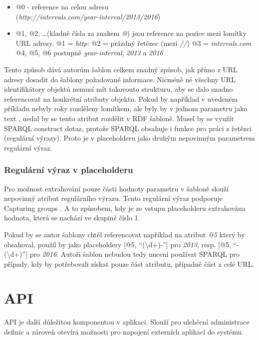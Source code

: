 \documentclass[thesis=B,czech]{FITthesis}[2012/06/26]
\begin{document}
 \begin{itemize}
  \item @0 - reference na celou adresu\\(\textit{http://intervals.com/year-interval/2013/2016})
  \item @1, @2, \ldots (kladné čísla za znakem \textit{@}) jsou reference na pozice mezi lomítky URL adresy.
    \subitem @1 = \textit{http:}
    \subitem @2 = prázdný řetězec (mezi \textit{//})
    \subitem @3 = \textit{intervals.com}
    \subitem @4, @5, @6 postupně \textit{year-interval}, \textit{2013} a \textit{2016}
 \end{itemize}
 Tento způsob dává autorům šablon celkem snadný způsob, jak přímo z URL adresy dosadit do šablony požadované informace. Nicméně né všechny URL identifikátory objektů
 nemusí mít takovouto strukturu, aby se dalo snadno referencovat na konkrétní atributy objektu. Pokud by například v uvedeném příkladu nebyly roky rozděleny lomítkem,
 ale byly by v jednom parametru jako text , nedal by se tento atribut rozdělit v RDF šabloně. Musel by se využít SPARQL construct dotaz, protože
 SPARQL obsahuje i funkce pro práci z řetězci (regulární výrazy). Proto je v placeholderu jako druhým nepovinným parametrem regulární výraz.
 
 \subsubsection{Regulární výraz v placeholderu}
  Pro možnost extrahování pouze části hodnoty parametru v šabloně slouží nepovinný atribut regulárního výrazu. Tento regulární výraz
  podporuje Capturing groups \cite{capture_group}. A to způsobem, kdy je ze vstupu placeholderu extrahována hodnota, která se nachází ve skupině číslo 1.
  
  Pokud by se autor šablony chtěl referencovat například na atribut \textit{@5} který by obsahoval, 
  použil by jako placeholdery [@5, ``(\textbackslash d+)-''] pro \textit{2013}, resp. [@5, ``-(\textbackslash d+)''] pro \textit{2016}.
  Autoři šablon nebudou tedy nuceni používat SPARQL pro případy, kdy by potřebovali získat pouze část atributu, případně část z celé URL.
  
  \section{API}
  API je další důležitou komponentou v aplikaci. Slouží pro ulehčení administrace definic a zároveň otevírá možnosti pro napojení externích
  aplikací do systému. 
  
\end{document}
